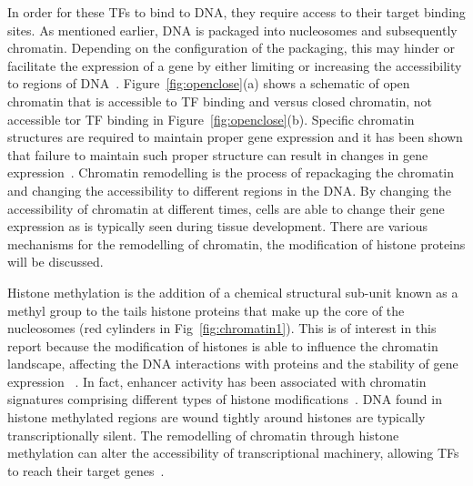         
        In order for these TFs to bind to DNA, they require access to their target binding sites. As mentioned earlier, DNA is packaged into nucleosomes and subsequently chromatin. Depending on the configuration of the packaging, this may hinder or facilitate the expression of a gene by either limiting or increasing the accessibility to regions of DNA~\cite{li2007role}. Figure~\ref{fig:openclose}(a) shows a schematic of open chromatin that is accessible to TF binding and versus closed chromatin, not accessible tor TF binding in Figure~\ref{fig:openclose}(b). Specific chromatin structures are required to maintain proper gene expression and it has been shown that failure to maintain such proper structure can result in changes in gene expression~\cite{ehrlich2001dna}. Chromatin remodelling is the process of repackaging the chromatin and changing the accessibility to different regions in the DNA. By changing the accessibility of chromatin at different times, cells are able to change their gene expression as is typically seen during tissue development. There are various mechanisms for the remodelling of chromatin, the modification of histone proteins will be discussed.%

        Histone methylation is the addition of a chemical structural sub-unit known as a methyl group to the tails histone proteins that make up the core of the nucleosomes (red cylinders in Fig~\ref{fig:chromatin1}). This is of interest in this report because the modification of histones is able to influence the chromatin landscape, affecting the DNA interactions with proteins and the stability of gene expression ~\cite{jaenisch2003epigenetic, whetstine2009histone}.
        In fact, enhancer activity has been associated with chromatin signatures comprising different types of histone modifications~\cite{heintzman2007distinct, creyghton2010histone, rada2011unique}.
        DNA found in histone methylated regions are wound tightly around histones are typically transcriptionally silent.
        The remodelling of chromatin through histone methylation can alter the accessibility of transcriptional machinery, allowing TFs to reach their target genes~\cite{gibney2010epigenetics, holoch2015rna}. 

